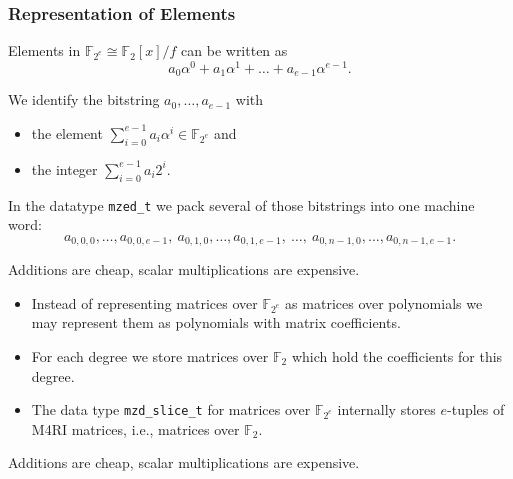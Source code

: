 \documentclass[11pt]{beamer}
\newcommand{\field}[1]{\mathbb{#1}}
\newcommand{\F}{\ensuremath{\field{F}}\xspace}
\newcommand{\FZ}{\ensuremath{\field{F}_2}\xspace}
\newcommand{\FZE}{\ensuremath{\field{F}_{2^e}}\xspace}
\newcommand{\mzedt}{\texttt{mzed\_t}\xspace}
\newcommand{\mzdslicet}{\texttt{mzd\_slice\_t}\xspace}
\begin{document}
\begin{frame}[allowframebreaks]
\frametitle{Representation of Elements} 

Elements in $\F_{2^e} \cong \F_2[x]/f$ can be written as $$a_0 \alpha^0 + a_1 \alpha^1 + \dots + a_{e-1} \alpha^{e-1}.$$

\vspace{1em}

We identify the bitstring $a_0,\dots,a_{e-1}$ with
 \begin{itemize}
  \item the element $\sum_{i=0}^{e-1} a_i \alpha^i \in \F_{2^e}$ and
  \item the integer $\sum_{i=0}^{e-1} a_i 2^i$.
 \end{itemize}

\vspace{1em}

\framebreak

In the datatype \mzedt we pack several of those bitstrings into one machine word: 
$$a_{0,0,0},\dots,a_{0,0,e-1},\ a_{0,1,0},\dots,a_{0,1,e-1},\ \dots,\ a_{0,n-1,0},\dots,a_{0,n-1,e-1}.$$

\begin{block}{}
Additions are cheap, scalar multiplications are expensive.
\end{block}

\framebreak

\begin{itemize}
\item Instead of representing matrices over \FZE as matrices over polynomials we may represent them as polynomials with matrix coefficients. 
\item For each degree we store matrices over \FZ which hold the coefficients for this degree. 
\item The data type \mzdslicet for matrices over $\FZE$ internally stores $e$-tuples of M4RI matrices, i.e., matrices over \FZ.
\end{itemize}

\begin{block}{}
Additions are cheap, scalar multiplications are expensive. 
\end{block}

\framebreak


\end{frame}
\end{document}

